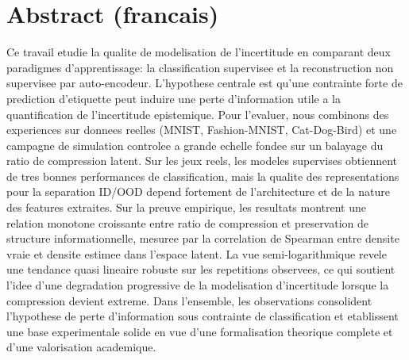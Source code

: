 \documentclass[11pt,a4paper]{article}
\begin{document}
\section*{Abstract (francais)}
Ce travail etudie la qualite de modelisation de l'incertitude en comparant deux paradigmes d'apprentissage: la classification supervisee et la reconstruction non supervisee par auto-encodeur. L'hypothese centrale est qu'une contrainte forte de prediction d'etiquette peut induire une perte d'information utile a la quantification de l'incertitude epistemique. Pour l'evaluer, nous combinons des experiences sur donnees reelles (MNIST, Fashion-MNIST, Cat-Dog-Bird) et une campagne de simulation controlee a grande echelle fondee sur un balayage du ratio de compression latent. Sur les jeux reels, les modeles supervises obtiennent de tres bonnes performances de classification, mais la qualite des representations pour la separation ID/OOD depend fortement de l'architecture et de la nature des features extraites. Sur la preuve empirique, les resultats montrent une relation monotone croissante entre ratio de compression et preservation de structure informationnelle, mesuree par la correlation de Spearman entre densite vraie et densite estimee dans l'espace latent. La vue semi-logarithmique revele une tendance quasi lineaire robuste sur les repetitions observees, ce qui soutient l'idee d'une degradation progressive de la modelisation d'incertitude lorsque la compression devient extreme. Dans l'ensemble, les observations consolident l'hypothese de perte d'information sous contrainte de classification et etablissent une base experimentale solide en vue d'une formalisation theorique complete et d'une valorisation academique.
\end{document}
